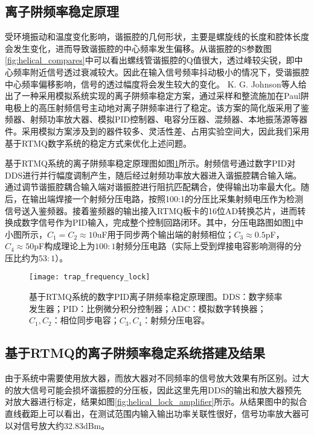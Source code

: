 \subsection[离子阱频率稳定原理]{离子阱频率稳定原理}
受环境振动和温度变化影响，谐振腔的几何形状，主要是螺旋线的长度和腔体长度会发生变化，进而导致谐振腔的中心频率发生偏移。从谐振腔的S参数图\ref{fig:helical_compares}中可以看出螺线管谐振腔的Q值很大，透过峰较尖锐，即中心频率附近信号透过衰减较大。因此在输入信号频率抖动极小的情况下，受谐振腔中心频率偏移影响，信号的透过幅度将会发生较大的变化。
K. G. Johnson等人\cite[]{Johnson_Wong_Campos_Restelli_Landsman_Neyenhuis_Mizrahi_Monroe_2016}给出了一种采用模拟系统实现的离子阱频率稳定方案，通过采样和整流施加在Paul阱电极上的高压射频信号主动地对离子阱频率进行了稳定。该方案的简化版采用了鉴频器、射频功率放大器、模拟PID控制器、电容分压器、混频器、本地振荡源等器件。采用模拟方案涉及到的器件较多、灵活性差、占用实验空间大，因此我们采用基于RTMQ数字系统的稳定方式来优化上述问题。

基于RTMQ系统的离子阱频率稳定原理图如图\ref{fig:trap_frequency_lock}所示。射频信号通过数字PID对DDS进行并行幅度调制产生，随后经过射频功率放大器进入谐振腔耦合输入端。通过调节谐振腔耦合输入端对谐振腔进行阻抗匹配耦合，使得输出功率最大化。随后，在输出端焊接一个射频分压电路，按照100:1的分压比采集射频电压作为检测信号送入鉴频器。接着鉴频器的输出接入RTMQ板卡的16位AD转换芯片，进而转换成数字信号作为PID输入，完成整个控制回路闭环。其中，分压电路图如图\ref{fig:trap_frequency_lock}中小图所示，$C_1=C_2\approx10$uF用于同步两个输出端的射频相位；$C_3\approx0.5$pF，$C_4\approx50$pF构成理论上为$100:1$射频分压电路（实际上受到焊接电容影响测得的分压比约为$53:1$）。

\begin{figure}
    \centering
    \caption[基于RTMQ系统的数字PID离子阱频率稳定原理图]{基于RTMQ系统的数字PID离子阱频率稳定原理图。DDS：数字频率发生器；PID：比例微分积分控制器；ADC：模拟数字转换器；$C_1,C_2$：相位同步电容；$C_3,C_4$：射频分压电容。\label{fig:trap_frequency_lock}}
    \texttt{[image: trap\_frequency\_lock]}
\end{figure}


\subsection[基于RTMQ的离子阱频率稳定系统搭建及结果]{基于RTMQ的离子阱频率稳定系统搭建及结果}

由于系统中需要使用放大器，而放大器对不同频率的信号放大效果有所区别。过大的放大信号可能会损坏谐振腔的分压板，因此这里先用DDS的输出和放大器预先对放大器进行标定，结果如图\ref{fig:helical_lock_amplifier}所示。从结果图中的拟合直线截距上可以看出，在测试范围内输入输出功率关联性很好，信号功率放大器可以对信号放大约32.83dBm。

